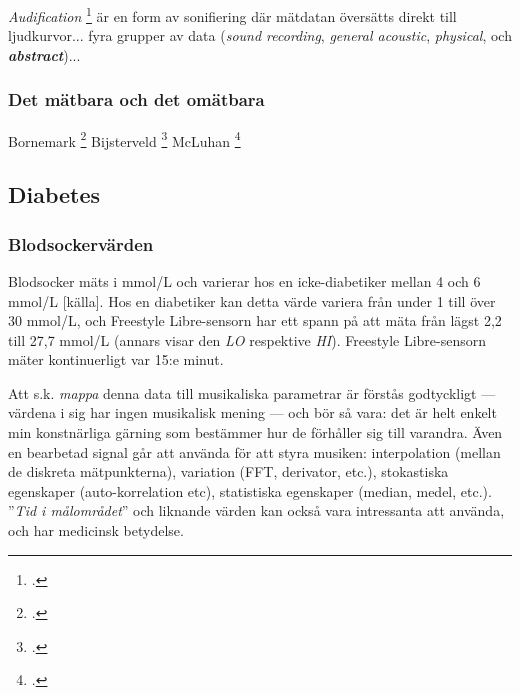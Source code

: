 \documentclass[11pt, twoside, a4paper]{article}
\begin{document}
\begin{multicols}{2}
\emph{Audification} \footcite[302]{noauthor_sonification_2011} är en form av sonifiering där mätdatan översätts direkt till ljudkurvor... fyra grupper av data (\emph{sound recording}, \emph{general acoustic}, \emph{physical}, och \textbf{\emph{abstract}})...

\subsubsection*{Det mätbara och det omätbara}
Bornemark \footcite{bornemark_det_2018}
Bijsterveld \footcite[100-102]{bijsterveld_sonic_2019}
McLuhan \footcite[2]{mcluhan_understanding_2015}

\subsection*{Diabetes}


\subsubsection*{Blodsockervärden}
Blodsocker mäts i mmol/L och varierar hos en icke-diabetiker mellan 4 och 6 mmol/L [källa]. Hos en diabetiker kan detta värde variera från under 1 till över 30 mmol/L, och Freestyle Libre-sensorn har ett spann på att mäta från lägst 2,2 till 27,7 mmol/L (annars visar den \emph{LO} respektive \emph{HI}). Freestyle Libre-sensorn mäter kontinuerligt var 15:e minut.

Att s.k. \emph{mappa} denna data till musikaliska parametrar är förstås godtyckligt --- värdena i sig har ingen musikalisk mening --- och bör så vara: det är helt enkelt min konstnärliga gärning som bestämmer hur de förhåller sig till varandra. Även en bearbetad signal går att använda för att styra musiken: interpolation (mellan de diskreta mätpunkterna), variation (FFT, derivator, etc.), stokastiska egenskaper (auto-korrelation etc), statistiska egenskaper (median, medel, etc.). ''\emph{Tid i målområdet}'' och liknande värden kan också vara intressanta att använda, och har medicinsk betydelse.


\end{multicols}
\end{document}
